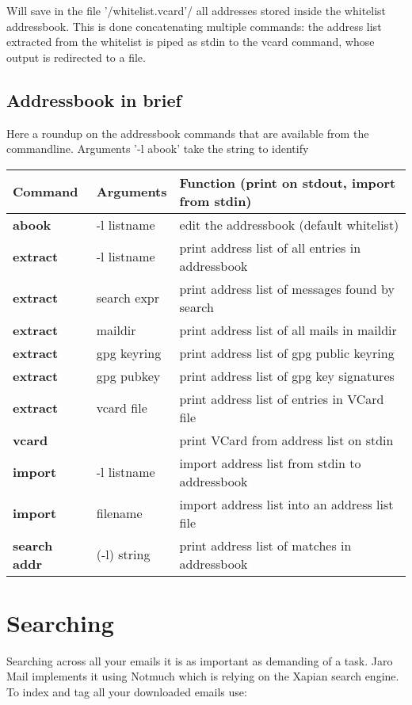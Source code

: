 \documentclass[a4,onecolumn,portrait]{article}
\begin{document}
Will save in the file '/whitelist.vcard'/ all addresses stored inside the whitelist addressbook. This is done concatenating multiple commands: the address list extracted from the whitelist is piped as stdin to the vcard command, whose output is redirected to a file.
\subsection{Addressbook in brief}
\label{sec-7-3}

Here a roundup on the addressbook commands that are available from the commandline. Arguments '-l abook' take the string to identify

\begin{center}
\begin{tabular}{lll}
Command & Arguments & Function (print on stdout, import from stdin)\\
\hline
\textbf{abook} & -l listname & edit the addressbook (default whitelist)\\
\textbf{extract} & -l listname & print address list of all entries in addressbook\\
\textbf{extract} & search expr & print address list of messages found by search\\
\textbf{extract} & maildir & print address list of all mails in maildir\\
\textbf{extract} & gpg keyring & print address list of gpg public keyring\\
\textbf{extract} & gpg pubkey & print address list of gpg key signatures\\
\textbf{extract} & vcard file & print address list of entries in VCard file\\
\textbf{vcard} &  & print VCard from address list on stdin\\
\textbf{import} & -l listname & import address list from stdin to addressbook\\
\textbf{import} & filename & import address list into an address list file\\
\textbf{search addr} & (-l) string & print address list of matches in addressbook\\
\end{tabular}
\end{center}


\section{Searching}
\label{sec-8}

Searching across all your emails it is as important as demanding of a task. Jaro Mail implements it using Notmuch which is relying on the Xapian search engine. To index and tag all your downloaded emails use:
\end{document}
